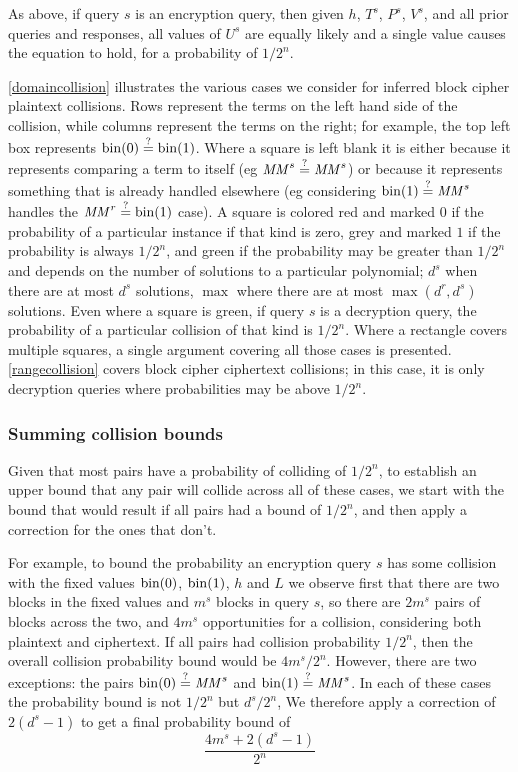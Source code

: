 \documentclass[hctr.tex]{subfiles}
\begin{document}
As above, if query \(s\) is an encryption query,
then given \(h\), \(T^s\), \(P^s\), \(V^s\),
and all prior queries and responses,
all values of \(U^s\) are equally likely
and a single value causes the equation to hold,
for a probability of \(1/2^n\).

\autoref{domaincollision} illustrates the various cases
we consider for inferred block cipher plaintext collisions.
Rows represent the terms
on the left hand side of the collision, while
columns represent the terms on the right; 
for example, the top left box represents
\(\operatorname{bin}(0) \stackrel{\text{?}}{=} \operatorname{bin}(1)\). Where a square is left blank
it is either because it represents
comparing a term to itself (eg \(\mathit{MM}^s \stackrel{\text{?}}{=} \mathit{MM}^s\))
or because it represents something that
is already handled elsewhere
(eg considering \(\operatorname{bin}(1) \stackrel{\text{?}}{=} \mathit{MM}^s\)
handles the \(\mathit{MM}^r \stackrel{\text{?}}{=} \operatorname{bin}(1)\) case).
A square is colored red
and marked \(0\) if the
probability of a particular instance
if that kind is zero, grey
and marked \(1\) if
the probability is always \(1/2^n\),
and green if the probability may be
greater than \(1/2^n\) and depends
on the number of solutions to a
particular polynomial;
\(d^s\) when there are at most \(d^s\) solutions,
\(\max\) where there are at most
\(\max(d^r, d^s)\) solutions.
Even where a square is green,
if query \(s\) is a decryption query,
the probability of a particular collision of
that kind is \(1/2^n\).
Where a rectangle covers
multiple squares, a single argument
covering all those cases is presented.
\autoref{rangecollision} covers
block cipher ciphertext collisions; in this case,
it is only decryption queries where
probabilities may be above \(1/2^n\).

\subsubsection{Summing collision bounds}
Given that most pairs have a probability of
colliding of \(1/2^n\), 
to establish an upper bound that any pair
will collide across all of these cases,
we start with the bound that would result
if all pairs had a bound of \(1/2^n\),
and then apply a correction for the ones that don't.

For example,
to bound the probability an encryption query \(s\)
has some collision with the fixed values 
\(\operatorname{bin}(0)\), \(\operatorname{bin}(1)\), \(h\) and \(L\)
we observe first that
there are two blocks in the fixed values
and \(m^s\) blocks in query \(s\), so there are
\(2m^s\) pairs of blocks across the two,
and \(4m^s\) opportunities for a collision, 
considering both plaintext and ciphertext.
If all pairs had collision probability \(1/2^n\),
then the overall collision probability bound
would be \(4m^s/2^n\). However, there are
two exceptions: the pairs
\(\operatorname{bin}(0) \stackrel{\text{?}}{=} \mathit{MM}^s\) and
\(\operatorname{bin}(1) \stackrel{\text{?}}{=} \mathit{MM}^s\). In each of these
cases the probability bound is not \(1/2^n\) but
\(d^s/2^n\), We therefore apply a correction
of \(2(d^s - 1)\) to get a final probability bound of
\begin{displaymath}
    \frac{4m^s + 2(d^s - 1)}{2^n}
\end{displaymath}
\end{document}
